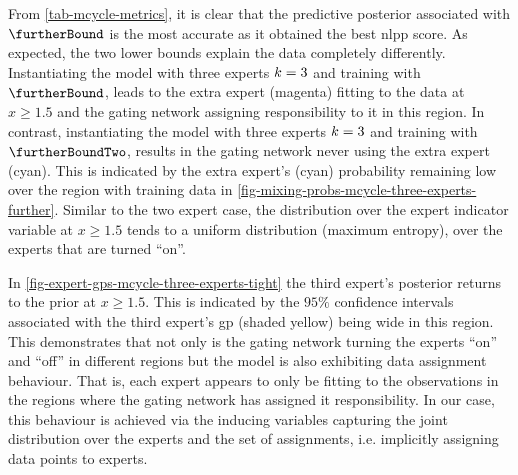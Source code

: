 \documentclass{mimosis-class/mimosis}
\numberwithin{equation}{chapter}
\newcommand{\modeInd}{\ensuremath{k}}
\newcommand{\ModeInd}{\ensuremath{\MakeUppercase{\modeInd}}}
\begin{document}
{From \cref{tab-mcycle-metrics}, it is clear that the predictive posterior associated with \(\furtherBound\)
is the most accurate as it obtained the best \acrshort{nlpp} score.
As expected, the two lower bounds explain the data completely differently.
Instantiating the model with three experts \(\ModeInd=3\) and training with \(\furtherBound\),
leads to the extra expert (magenta) fitting to the data at \(x \geq 1.5\) and the gating network
assigning responsibility to it in this region.
In contrast, instantiating the model with three experts \(\ModeInd=3\) and training with
\(\furtherBoundTwo\), results in the gating network never using the extra expert (cyan).
This is indicated by the extra expert's (cyan) probability remaining low over the region with training data in
\cref{fig-mixing-probs-mcycle-three-experts-further}.
Similar to the two expert case, the distribution over the expert indicator variable at \(x \geq 1.5\)
tends to a uniform distribution (maximum entropy), over the experts that are turned ``on''.

In \cref{fig-expert-gps-mcycle-three-experts-tight} the third expert's posterior returns to the prior at
\(x \geq 1.5\).
This is indicated by the \(95\%\) confidence intervals associated with the third expert's \acrshort{gp} (shaded yellow)
being wide in this region.
This demonstrates that not only is the gating network turning the experts ``on'' and ``off'' in different regions
but the model is also exhibiting data assignment behaviour.
That is, each expert appears to only be fitting to the observations in the regions where the gating network
has assigned it responsibility.
In our case, this behaviour is achieved via the inducing variables capturing the joint distribution over the
experts and the set of assignments, i.e. implicitly assigning data points to experts.

}
\end{document}
